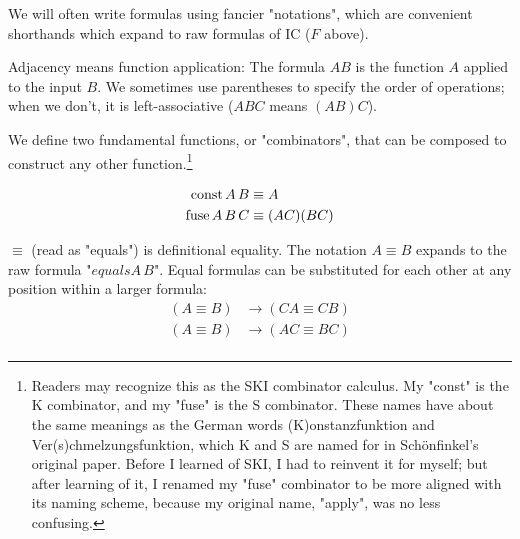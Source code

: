 \documentclass{article}
\begin{document}
  We will often write formulas using fancier "notations", which are convenient shorthands which expand to raw formulas of IC ($F$ above).
  
  Adjacency means function application: The formula $AB$ is the function $A$ applied to the input $B$. We sometimes use parentheses to specify the order of operations; when we don't, it is left-associative ($ABC$ means $(AB)C$).
  
  We define two fundamental functions, or "combinators", that can be composed to construct any other function.\footnote{Readers may recognize this as the SKI combinator calculus. My "const" is the K combinator, and my "fuse" is the S combinator. These names have about the same meanings as the German words (K)onstanzfunktion and Ver(s)chmelzungsfunktion, which K and S are named for in Schönfinkel's original paper. Before I learned of SKI, I had to reinvent it for myself; but after learning of it, I renamed my "fuse" combinator to be more aligned with its naming scheme, because my original name, "apply", was no less confusing.}
  
  
  \begin{align*}
    \operatorname{\mathrm{const}} A\,B &\equiv A\\
    \operatorname{\mathrm{fuse}} A\,B\,C &\equiv (AC)(BC)\\
  \end{align*}
  
  $\equiv$ (read as "equals") is definitional equality. The notation $A \equiv B$ expands to the raw formula "$equals A\,B$". Equal formulas can be substituted for each other at any position within a larger formula:
  \begin{align*}
    (A \equiv B) &\to (CA \equiv CB)\\
    (A \equiv B) &\to (AC \equiv BC)\\
  \end{align*}  
  
  
  
  \newcommand{\nameabst}[1]{#1 \Rightarrow}
  
\end{document}
